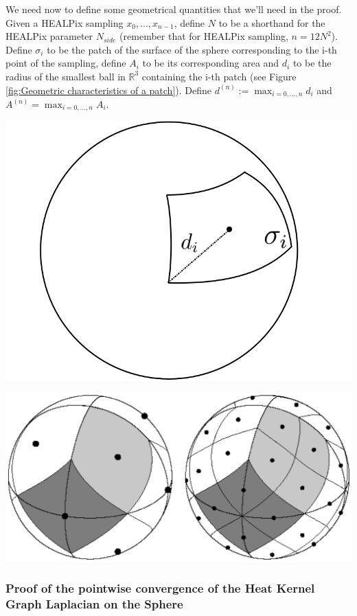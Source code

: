 We need now to define some geometrical quantities that we'll need in the proof.
Given a HEALPix sampling $x_0, ..., x_{n-1}$, define $N$ to be a shorthand for the HEALPix parameter $N_{side}$ (remember that for HEALPix sampling, $n=12N^2$). Define $\sigma_i$ to be the patch of the surface of the sphere corresponding to the i-th point of the sampling, define $A_i$ to be its corresponding area and $d_i$ to be the radius of the smallest ball in $\mathbb R^3$ containing the i-th patch (see Figure \ref{fig:Geometric characteristics of a patch}). Define $d^{(n)} := \max_{i=0, ..., n}d_i$ and $A^{(n)}=\max_{i=0, ..., n}A_i$.\\

\begin{minipage}{.5\textwidth}
	\centering
	\includegraphics[width=0.4\linewidth]{figs/chapter1/d_iA_i.jpg}
	\label{fig:Geometric characteristics of a patch}
\end{minipage}%
\begin{minipage}{.5\textwidth}
	\centering
	\includegraphics[width=0.7\linewidth]{figs/chapter1/Heal_Base.png}
	\label{fig:HEALPix equal areas patches}
	\vspace{0.5cm}
\end{minipage}

\subsubsection{Proof of the pointwise convergence of the Heat Kernel Graph Laplacian on the Sphere}


